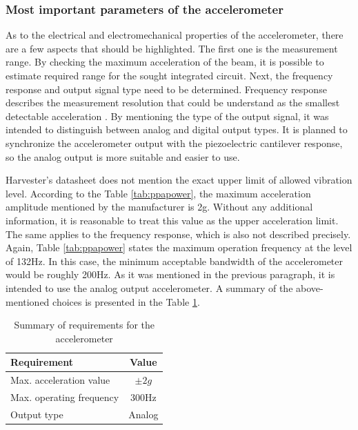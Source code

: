 \documentclass[12pt,a4paper]{article}
\begin{document}
\subsubsection{Most important parameters of the accelerometer}
As to the electrical and electromechanical properties of the accelerometer, there are a few aspects that should be highlighted. The first one is the measurement range. By checking the maximum acceleration of the beam, it is possible to estimate required range for the sought integrated circuit. Next, the frequency response and output signal type need to be determined. Frequency response describes the measurement resolution that could be understand as the smallest detectable acceleration \cite{accel_params}. By mentioning the type of the output signal, it was intended to distinguish between analog and digital output types. It is planned to synchronize the accelerometer output with the piezoelectric cantilever response, so the analog output is more suitable and easier to use.
\par
Harvester's datasheet \cite{PPA} does not mention the exact upper limit of allowed vibration level. According to the Table \ref{tab:ppapower}, the maximum acceleration amplitude mentioned by the manufacturer is 2g. Without any additional information, it is reasonable to treat this value as the upper acceleration limit. The same applies to the frequency response, which is also not described precisely. Again, Table \ref{tab:ppapower} states the maximum operation frequency at the level of 132Hz. In this case, the minimum acceptable bandwidth of the accelerometer would be roughly 200Hz. As it was mentioned in the previous paragraph, it is intended to use the analog output accelerometer. A summary of the above-mentioned choices is presented in the Table \ref{tab:accel_requirements}.

\begin{table}[ht!]
\begin{tabular}{|l|c|}
\hline
\textbf{Requirement}            & \textbf{Value} \\ \hline
Max. acceleration value  		& $\pm{2}g$         \\ \hline
Max. operating frequency        & 300Hz        \\ \hline
Output type             		& Analog         \\ \hline
\end{tabular}
\caption{Summary of requirements for the accelerometer}
\label{tab:accel_requirements}
\end{table}
\par
\end{document}
